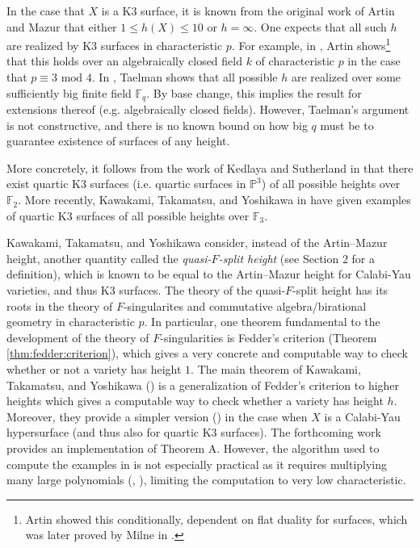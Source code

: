 \documentclass[a4paper]{article}
\theoremstyle{definition}
\theoremstyle{remark}
\newcommand{\mathmod}{ \text{ mod }}
\begin{document}
In the case that \(X\) is a K3 surface, it is known from the 
original work of Artin and Mazur
that either \(1 \leq h(X) \leq 10\) or \(h = \infty\).
One expects that all such $h$ are realized by K3 surfaces
in characteristic $p$.
For example, in \cite{artin-1974-k3-surfaces},
Artin shows\footnote{
    Artin showed this conditionally, dependent on flat
    duality for surfaces, which was later proved
    by Milne in \cite{milne-1976-flat-duality}.
}
that this holds over an algebraically
closed field \(k\) of characteristic \(p\) in the
case that \(p \equiv 3 \mathmod 4\).
In \cite{taelman-2016-k3-given-l-function}, 
Taelman shows that
all possible \(h\) are realized
over some sufficiently big finite field \(\mathbb{F}_{q}\). 
By base change, this implies the result for extensions
thereof (e.g. algebraically closed fields).
However, Taelman's argument is not constructive,
and there is no known bound on how big \(q\) must be to guarantee
existence of surfaces of any height.

More concretely, it follows from the work of
Kedlaya and Sutherland in 
\cite{kedlaya-sutherland-2016-census-k3-f2}
that there exist quartic K3 surfaces
(i.e. quartic surfaces in \(\mathbb{P}^{3}\))
of all possible heights over \(\mathbb{F}_{2}\).
More recently,
Kawakami, Takamatsu, and Yoshikawa in \cite{kty-2022-fedder}
have given examples of quartic K3 surfaces
of all possible heights over \(\mathbb{F}_{3}\).

Kawakami, Takamatsu, and Yoshikawa consider, 
instead of the Artin--Mazur height, another quantity called the
\textit{quasi-\(F\)-split height} 
(see Section 2 for a definition),
which is known to be equal to the Artin--Mazur height
for Calabi-Yau varieties, and thus K3 surfaces.
The theory of the quasi-\(F\)-split height has its
roots in the theory of \(F\)-singularites and commutative
algebra/birational geometry in characteristic \(p\).
In particular, one theorem fundamental
to the development of the theory of \(F\)-singularities
is Fedder's criterion (Theorem \ref{thm:fedder:criterion}), 
which gives a very concrete and computable way to check
whether or not a variety has height \(1\).
The main theorem of Kawakami, Takamatsu, and Yoshikawa
(\cite[Theorem~A]{kty-2022-fedder})
is a generalization of Fedder's criterion
to higher heights which gives a 
computable way to check whether a variety has height \(h\).
Moreover, they provide a simpler version
(\cite[Theorem~C]{kty-2022-fedder})
in the case when \(X\) is a Calabi-Yau hypersurface
(and thus also for quartic K3 surfaces).
The forthcoming work 
\cite{fgmqt-2025-witt-vectors-macaulay2} 
provides an implementation of Theorem A.
However, the algorithm used to compute the examples in
\cite{kty-2022-fedder}
is not especially practical
as it requires multiplying many large polynomials
(\cite{takamatsu-2024-algorithm}, 
\cite{fgmqt-2025-witt-vectors-macaulay2}),
limiting the computation to
very low characteristic.
\end{document}
